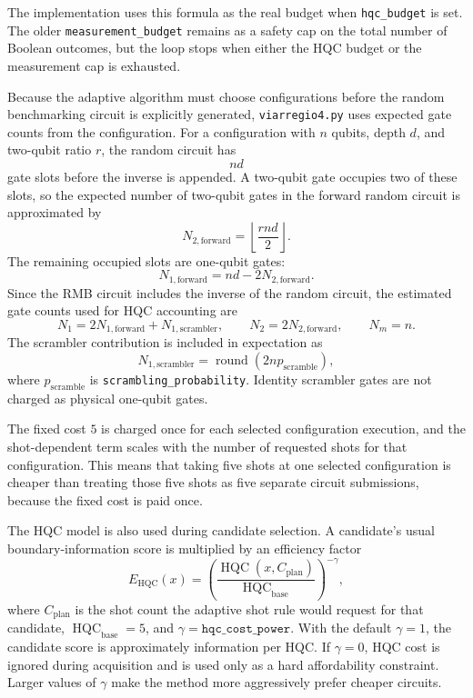 The implementation uses this formula as the real budget when
\texttt{hqc\_budget} is set.  The older \texttt{measurement\_budget} remains as
a safety cap on the total number of Boolean outcomes, but the loop stops when
either the HQC budget or the measurement cap is exhausted.

Because the adaptive algorithm must choose configurations before the random
benchmarking circuit is explicitly generated, \texttt{viarregio4.py} uses
expected gate counts from the configuration.  For a configuration with \(n\)
qubits, depth \(d\), and two-qubit ratio \(r\), the random circuit has
\[
    nd
\]
gate slots before the inverse is appended.  A two-qubit gate occupies two of
these slots, so the expected number of two-qubit gates in the forward random
circuit is approximated by
\[
    N_{2,\mathrm{forward}}
    =
    \left\lfloor \frac{rnd}{2} \right\rfloor.
\]
The remaining occupied slots are one-qubit gates:
\[
    N_{1,\mathrm{forward}}
    =
    nd - 2N_{2,\mathrm{forward}}.
\]
Since the RMB circuit includes the inverse of the random circuit, the estimated
gate counts used for HQC accounting are
\[
    N_1 = 2N_{1,\mathrm{forward}} + N_{1,\mathrm{scrambler}},
    \qquad
    N_2 = 2N_{2,\mathrm{forward}},
    \qquad
    N_m = n.
\]
The scrambler contribution is included in expectation as
\[
    N_{1,\mathrm{scrambler}}
    =
    \operatorname{round}(2n p_{\mathrm{scramble}}),
\]
where \(p_{\mathrm{scramble}}\) is \texttt{scrambling\_probability}.  Identity
scrambler gates are not charged as physical one-qubit gates.

The fixed cost \(5\) is charged once for each selected configuration execution,
and the shot-dependent term scales with the number of requested shots for that
configuration.  This means that taking five shots at one selected configuration
is cheaper than treating those five shots as five separate circuit submissions,
because the fixed cost is paid once.

The HQC model is also used during candidate selection.  A candidate's usual
boundary-information score is multiplied by an efficiency factor
\[
    E_{\mathrm{HQC}}(x)
    =
    \left(
        \frac{\operatorname{HQC}(x,C_{\mathrm{plan}})}
             {\operatorname{HQC}_{\mathrm{base}}}
    \right)^{-\gamma},
\]
where \(C_{\mathrm{plan}}\) is the shot count the adaptive shot rule would
request for that candidate, \(\operatorname{HQC}_{\mathrm{base}}=5\), and
\(\gamma=\texttt{hqc\_cost\_power}\).  With the default
\(\gamma=1\), the candidate score is approximately information per HQC.  If
\(\gamma=0\), HQC cost is ignored during acquisition and is used only as a hard
affordability constraint.  Larger values of \(\gamma\) make the method more
aggressively prefer cheaper circuits.

